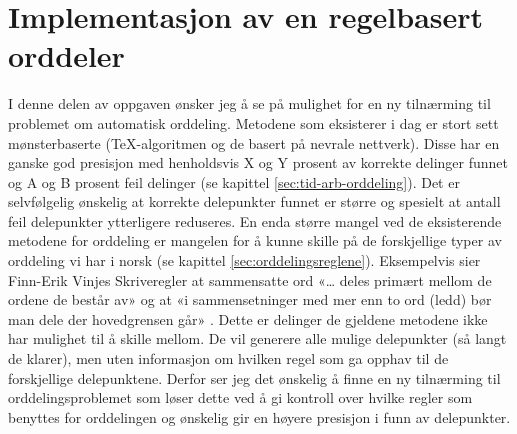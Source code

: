 \chapter{Implementasjon av en regelbasert orddeler}

I denne delen av oppgaven ønsker jeg å se på mulighet for en ny tilnærming til problemet om automatisk orddeling. Metodene som eksisterer i dag er stort sett mønsterbaserte (\TeX{}-algoritmen og de basert på nevrale nettverk). Disse har en ganske god presisjon med henholdsvis X og Y prosent av korrekte delinger funnet og A og B prosent feil delinger (se kapittel \ref{sec:tid-arb-orddeling}). Det er selvfølgelig ønskelig at korrekte delepunkter funnet er større og spesielt at antall feil delepunkter ytterligere reduseres. En enda større mangel ved de eksisterende metodene for orddeling er mangelen for å kunne skille på de forskjellige typer av orddeling vi har i norsk (se kapittel \ref{sec:orddelingsreglene}). Eksempelvis sier Finn-Erik Vinjes Skriveregler at sammensatte ord «… deles primært mellom de ordene de består av» og at «i sammensetninger med mer enn to ord (ledd) bør man dele der hovedgrensen går» \cite{vinje}. Dette er delinger de gjeldene metodene ikke har mulighet til å skille mellom. De vil generere alle mulige delepunkter (så langt de klarer), men uten informasjon om hvilken regel som ga opphav til de forskjellige delepunktene. Derfor ser jeg det ønskelig å finne en ny tilnærming til orddelingsproblemet som løser dette ved å gi kontroll over hvilke regler som benyttes for orddelingen og ønskelig gir en høyere presisjon i funn av delepunkter.

